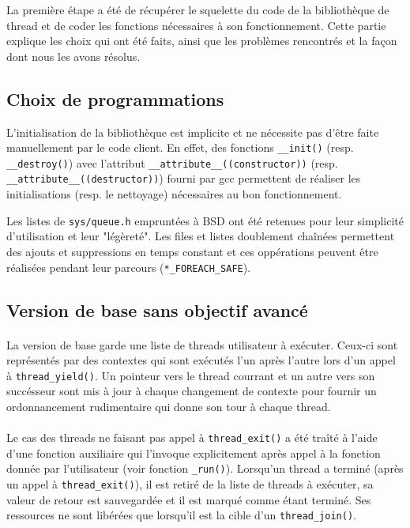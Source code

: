 La première étape a été de récupérer le squelette du code de la bibliothèque de thread et de coder les fonctions nécessaires à son fonctionnement. Cette partie explique les choix qui ont été faits, ainsi que les problèmes rencontrés et la façon dont nous les avons résolus.

\subsection{Choix de programmations}

L'initialisation de la bibliothèque est implicite et ne nécessite pas d'être
faite manuellement par le code client. En effet, des fonctions \verb!__init()!
(resp. \verb!__destroy()!) avec l'attribut \verb!__attribute__((constructor))!
(resp. \verb!__attribute__((destructor))!) fourni par gcc permettent de
réaliser les initialisations (resp. le nettoyage) nécessaires au bon
fonctionnement.

Les listes de \verb!sys/queue.h! empruntées à BSD ont été retenues pour leur
simplicité d'utilisation et leur "légèreté". Les files et listes doublement
chaînées permettent des ajouts et suppressions en temps constant et ces
oppérations peuvent être réalisées pendant leur parcours
(\verb!*_FOREACH_SAFE!).


\subsection{Version de base sans objectif avancé}

\paragraph{} La version de base garde une liste de threads utilisateur à exécuter. Ceux-ci sont représentés par des contextes qui sont exécutés l'un après l'autre lors d'un appel à \verb!thread_yield()!. Un pointeur vers le thread courrant et un autre vers son succésseur sont mis à jour à chaque changement de contexte pour fournir un ordonnancement rudimentaire qui donne son tour à chaque thread.

\paragraph{} Le cas des threads ne faisant pas appel à \verb!thread_exit()! a été traîté à l'aide d'une fonction auxiliaire qui l'invoque explicitement après appel à la fonction donnée par l'utilisateur (voir fonction \verb!_run()!). Lorsqu'un thread a terminé (après un appel à \verb!thread_exit()!), il est retiré de la liste de threads à exécuter, sa valeur de retour est sauvegardée et il est marqué comme étant terminé. Ses ressources ne sont libérées que lorsqu'il est la cible d'un \verb!thread_join()!.


